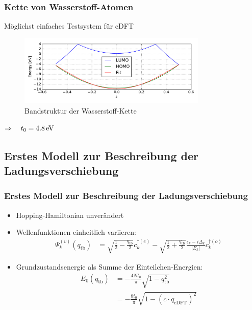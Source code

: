 \begin{frame}
\frametitle{Kette von Wasserstoff-Atomen}
\begin{minipage}{0.6\textwidth}
Möglichst einfaches Testsystem für cDFT
\end{minipage}
\begin{minipage}{0.39\textwidth}
\centering
{}
\end{minipage}
\begin{figure}[]
	\centering
	\includegraphics[width = 9cm]{Images/Hydrogen/bands/hydrogen_band_structure}
	\caption{Bandstruktur der Wasserstoff-Kette}
	\label{image_hydrogen_band_structure}
\end{figure}
\centering
$\Rightarrow\quad t_0 = \unit[4.8]{eV}$ 
\end{frame}

\subsection{Erstes Modell zur Beschreibung der Ladungsverschiebung}
\begin{frame}
\frametitle{Erstes Modell zur Beschreibung der Ladungsverschiebung}
\begin{itemize}
\setlength{\itemsep}{.5cm}
\item Hopping-Hamiltonian unverändert
\item Wellenfunktionen einheitlich variieren:
\begin{align*}
\Psi_k^{(v)}(q_\text{tb}) &= \sqrt{\frac{1}{2}-\frac{q_\text{tb}}{2}}c_k^{\dagger(e)}- \sqrt{\frac{1}{2}+\frac{q_\text{tb}}{2}}\frac{\epsilon_k - i \Delta_k}{|E_k|}c_{k}^{\dagger(o)}
\end{align*}
\item Grundzustandsenergie als Summe der Einteilchen-Energien:
\begin{align*}
E_0(q_\text{tb}) &= -\frac{4Nt_0}{\pi} \sqrt{1-q^2_\text{tb}}\\
&= -\frac{8t_0}{\pi} \sqrt{1 - \left(c\cdot q_\text{cDFT}\right)^2}
\end{align*}
\end{itemize}
\end{frame}

